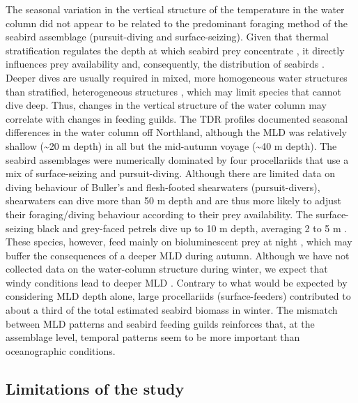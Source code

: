\documentclass[preprint, 3p, authoryear]{elsarticle} %
\begin{document}
The seasonal variation in the vertical structure of the temperature in the water column did not appear to be related to the predominant foraging method of the seabird assemblage (pursuit-diving and surface-seizing). Given that thermal stratification regulates the depth at which seabird prey concentrate \cite[e.g.,][]{davoren2006, cox2013}, it directly influences prey availability and, consequently, the distribution of seabirds \citep{scott2010, cox2018, serratosa2020}. Deeper dives are usually required in mixed, more homogeneous water structures than stratified, heterogeneous structures \citep{takahashi2008, meyer2020}, which may limit species that cannot dive deep. Thus, changes in the vertical structure of the water column may correlate with changes in feeding guilds. The TDR profiles documented seasonal differences in the water column off Northland, although the MLD was relatively shallow (\textasciitilde20 m depth) in all but the mid-autumn voyage (\textasciitilde40 m depth). The seabird assemblages were numerically dominated by four procellariids that use a mix of surface-seizing and pursuit-diving. Although there are limited data on diving behaviour of Buller's and flesh-footed shearwaters (pursuit-divers), shearwaters can dive more than 50 m depth \citep{taylor2008, rayner2011} and are thus more likely to adjust their foraging/diving behaviour according to their prey availability. The surface-seizing black and grey-faced petrels dive up to 10 m depth, averaging 2 to 5 m \citep{dunphy2015, bell2016}. These species, however, feed mainly on bioluminescent prey at night \citep{imber1973, imber1976}, which may buffer the consequences of a deeper MLD during autumn. Although we have not collected data on the water-column structure during winter, we expect that windy conditions lead to deeper MLD \citep{serazin2023}. Contrary to what would be expected by considering MLD depth alone, large procellariids (surface-feeders) contributed to about a third of the total estimated seabird biomass in winter. The mismatch between MLD patterns and seabird feeding guilds reinforces that, at the assemblage level, temporal patterns seem to be more important than oceanographic conditions.

\subsection{Limitations of the study}
\end{document}
